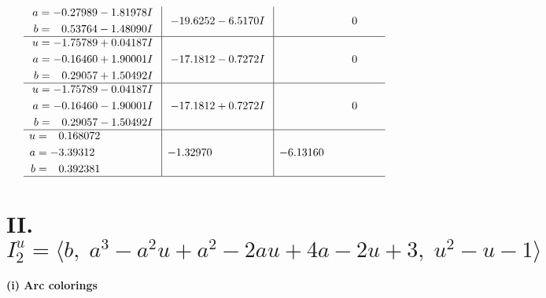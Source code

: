 \documentclass[1p]{elsarticle_modified}
\theoremstyle{definition}
\begin{document}
$$\begin{array}{c|c|c}
\begin{aligned}
a &= -0.27989 - 1.81978 I \\
b &= \phantom{-}0.53764 - 1.48090 I\end{aligned}
 & -19.6252 - 6.5170 I & \phantom{-0.000000 } 0 \\ \hline\begin{aligned}
u &= -1.75789 + 0.04187 I \\
a &= -0.16460 + 1.90001 I \\
b &= \phantom{-}0.29057 + 1.50492 I\end{aligned}
 & -17.1812 - 0.7272 I & \phantom{-0.000000 } 0 \\ \hline\begin{aligned}
u &= -1.75789 - 0.04187 I \\
a &= -0.16460 - 1.90001 I \\
b &= \phantom{-}0.29057 - 1.50492 I\end{aligned}
 & -17.1812 + 0.7272 I & \phantom{-0.000000 } 0 \\ \hline\begin{aligned}
u &= \phantom{-}0.168072\phantom{ +0.000000I} \\
a &= -3.39312\phantom{ +0.000000I} \\
b &= \phantom{-}0.392381\phantom{ +0.000000I}\end{aligned}
 & -1.32970\phantom{ +0.000000I} & -6.13160\phantom{ +0.000000I}\\
 \hline 
 \end{array}$$\newpage\newpage\renewcommand{\arraystretch}{1}
\centering \section*{II. $I^u_{2}= \langle b,\;a^3- a^2 u+a^2-2 a u+4 a-2 u+3,\;u^2- u-1 \rangle$}
\flushleft \textbf{(i) Arc colorings}\\
\end{document}
